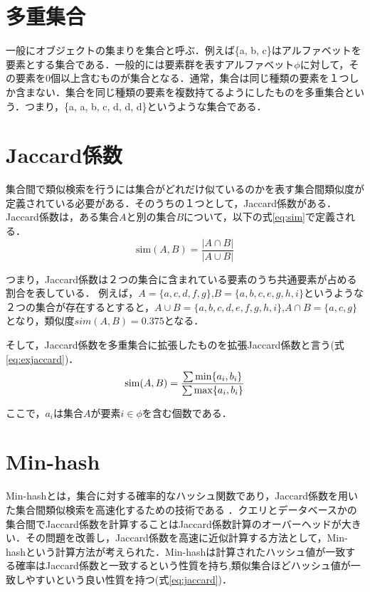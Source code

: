\section{多重集合}
一般にオブジェクトの集まりを集合と呼ぶ．例えば\{a, b, c\}はアルファベットを要素とする集合である．一般的には要素群を表すアルファベット$\phi$に対して，その要素を0個以上含むものが集合となる．通常，集合は同じ種類の要素を１つしか含まない．集合を同じ種類の要素を複数持てるようにしたものを多重集合という．つまり，\{a, a, b, c, d, d, d\}というような集合である．


\section{Jaccard係数}
集合間で類似検索を行うには集合がどれだけ似ているのかを表す集合間類似度が定義されている必要がある．そのうちの１つとして，Jaccard係数がある．
Jaccard係数は，ある集合$A$と別の集合$B$について，以下の式\ref{eq:sim}で定義される．
\begin{equation}
\label{eq:sim}
\mathrm{sim}(A,B)=  \frac {|A \cap {B} |} {|A \cup {B}| }
\end{equation}

つまり，Jaccard係数は２つの集合に含まれている要素のうち共通要素が占める割合を表している．
例えば，$A=\{a,c,d,f,g\}$,$B=\{a,b,c,e,g,h,i\}$というような２つの集合が存在するとすると，${A \cup {B} }=\{a,b,c,d,e,f,g,h,i\}$,$ {A \cap {B} }=\{a,c,g\}$となり，類似度$sim(A,B)=0.375$となる．

そして，Jaccard係数を多重集合に拡張したものを拡張Jaccard係数と言う(式 \ref{eq:exjaccard})．
\begin{equation}
\label{eq:exjaccard}
\mathrm{sim}(A,B)=  \frac {\sum{\mathrm{min}\{a_i,b_i\}}} {\sum{\mathrm{max}\{a_i,b_i\}} }\\
\end{equation}

ここで，$a_i$は集合$A$が要素$i∈\phi$を含む個数である．

\section{Min-hash}
Min-hashとは，集合に対する確率的なハッシュ関数であり，Jaccard係数を用いた集合間類似検索を高速化するための技術である \cite{Minhash}．クエリとデータベースかの集合間でJaccard係数を計算することはJaccard係数計算のオーバーヘッドが大きい．その問題を改善し，Jaccard係数を高速に近似計算する方法として，Min-hashという計算方法が考えられた．Min-hashは計算されたハッシュ値が一致する確率はJaccard係数と一致するという性質を持ち,類似集合ほどハッシュ値が一致しやすいという良い性質を持つ(式\ref{eq:jaccard})．

